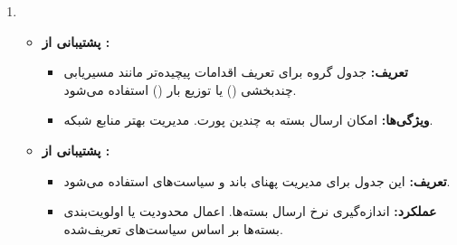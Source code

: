 \begin{qsolve}
	\begin{enumerate}
		\item [ ]
		\begin{itemize}
			\begin{itemize}
				\item \textbf{مزایا:} پردازش مرحله‌ای و ماژولار. امکان تعریف قوانین پیچیده و چندلایه. بهینه‌سازی پردازش بسته‌ها در شبکه.
			\end{itemize}
			
			
			\item \textbf{پشتیبانی از :}
			\begin{itemize}
				\item \textbf{تعریف:} جدول گروه برای تعریف اقدامات پیچیده‌تر مانند مسیریابی چندبخشی () یا توزیع بار () استفاده می‌شود.
				\item \textbf{ویژگی‌ها:} امکان ارسال بسته به چندین پورت. مدیریت بهتر منابع شبکه.
			\end{itemize}
			\item \textbf{پشتیبانی از :}
			\begin{itemize}
				\item \textbf{تعریف:} این جدول برای مدیریت پهنای باند و سیاست‌های  استفاده می‌شود.
				\item \textbf{عملکرد:} اندازه‌گیری نرخ ارسال بسته‌ها. اعمال محدودیت یا اولویت‌بندی بسته‌ها بر اساس سیاست‌های تعریف‌شده.
			\end{itemize}
		\end{itemize}
	\end{enumerate}
\end{qsolve}





